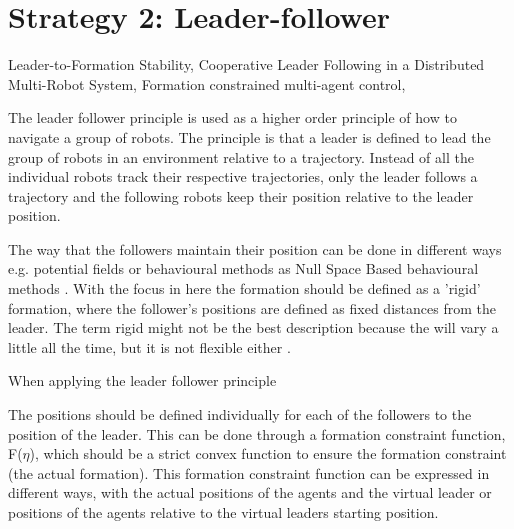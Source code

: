 \section{Strategy 2: Leader-follower}
Leader-to-Formation Stability,
Cooperative Leader Following in a Distributed Multi-Robot System,
Formation constrained multi-agent control, 

The leader follower principle is used as a higher order principle of how to navigate a group of robots. The principle is that a leader is defined to lead the group of robots in an environment relative to a trajectory. Instead of all the individual robots track their respective trajectories, only the leader follows a trajectory and the following robots keep their position relative to the leader position.

The way that the followers maintain their position can be done in different ways e.g. potential fields \citep{pfmrm} or behavioural methods as Null Space Based behavioural methods \citep{arrichiello2006formation}. With the focus in here the formation should be defined as a 'rigid' formation, where the follower's positions are defined as fixed distances from the leader. The term rigid might not be the best description because the will vary a little all the time, but it is not flexible either \citep{976029}.

When applying the leader follower principle 

The positions should be defined individually for each of the followers to the position of the leader. This can be done through a formation constraint function, F($\eta$), which should be a strict convex function to ensure the formation constraint (the actual formation). This formation constraint function can be expressed in different ways, with the actual positions of the agents and the virtual leader or positions of the agents relative to the virtual leaders starting position.

